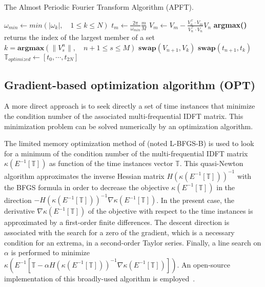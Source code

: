 \begin{algorithm}[htb]
\caption{The Almost Periodic Fourier Transform Algorithm (APFT).}
\label{alg:algo_APFT}
\begin{algorithmic}
\STATE $\omega_{min} \leftarrow min \left( |\omega_k |,\quad 1 \leqslant k \leqslant N \right)$
    \STATE $t_m \leftarrow \displaystyle\frac{2\pi}{\omega_{min}}\frac{m}{M}$
\ENDFOR
{}
  \STATE $ V_{m} \leftarrow V_{m} - \displaystyle\frac{V_{n}^\top \cdot V_{m}}{V_{n}^\top \cdot V_{n}} V_{n}$
   \ENDFOR
   \STATE \textbf{argmax()} returns the index of the largest member of a set
   \STATE $k=\textbf{argmax} \left( \| V_s^n \|,\quad n+1\leqslant s \leqslant M\right) $
   \STATE $\textbf{swap}(V_{n+1},V_{k})$
   \STATE $\textbf{swap}(t_{n+1},t_{k})$
\ENDFOR
\STATE $\mathbb{T}_{optimized} \leftarrow [t_0, \cdots, t_{2N}]$
\end{algorithmic}
\end{algorithm}

\subsection{Gradient-based optimization algorithm (OPT)}
A more direct approach is to seek directly a set of time instances
that minimize the condition number of the associated multi-frequential IDFT matrix. 
This minimization problem can be solved numerically by an optimization algorithm.

The limited memory optimization method of
\citet{Byrd1995} (noted L-BFGS-B) is
used to look for a minimum of the condition number of the
multi-frequential IDFT matrix $\kappa \left(E^{-1} \left[\mathbb{T} \right]
\right)$ as function of the time instances vector $\mathbb{T}$. This
quasi-Newton algorithm approximates the inverse Hessian matrix
$H(\kappa \left(E^{-1} \left[\mathbb{T} \right] \right))^{-1}$ with the
BFGS formula in order to decrease the objective $\kappa \left(E^{-1}
  \left[\mathbb{T} \right] \right)$ in the direction $-H(\kappa
\left(E^{-1} \left[\mathbb{T} \right] \right))^{-1}\nabla \kappa \left(E^{-1}
  \left[\mathbb{T} \right] \right)$. In the present case, the
derivative $\nabla \kappa \left(E^{-1} \left[\mathbb{T} \right] \right)$ of
the objective with respect to the time instances is approximated by
a first-order finite differences. The descent direction is
associated with the search for a zero of the gradient, which is a
necessary condition for an extrema, in a second-order Taylor series.
Finally, a line search on $\alpha$ is performed to minimize $\kappa
\left(E^{-1} \left[\mathbb{T} - \alpha H(\kappa \left(E^{-1} \left[\mathbb{T}
      \right] \right))^{-1} \nabla \kappa \left(E^{-1} \left[\mathbb{T}
      \right] \right) \right] \right)$.  An open-source implementation of this
broadly-used algorithm is
employed~\cite{Nocedal1980}.

